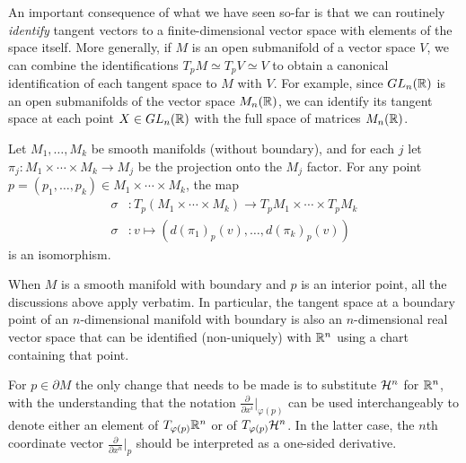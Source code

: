 An important consequence of what we have seen so-far is that we can routinely \emph{identify} tangent vectors to a finite-dimensional vector space with elements of the space itself.
More generally, if $M$ is an open submanifold of a vector space $V$, we can combine the identifications $T_p M \simeq T_p V \simeq V$ to obtain a canonical identification of each tangent space to $M$ with $V$.
For example, since $GL_n(\mathbb{R})$ is an open submanifolds of the vector space $M_n(\mathbb{R})$, we can identify its tangent space at each point $X\in GL_n(\mathbb{R})$ with the full space of matrices $M_n(\mathbb{R})$.

\begin{exercise}
  Let $M_1, \ldots, M_k$ be smooth manifolds (without boundary), and for each $j$ let $\pi_j:M_1\times\cdots\times M_k \to M_j$ be the projection onto the $M_j$ factor.
  For any point $p=(p_1,\ldots,p_k)\in M_1\times\cdots\times M_k$, the map
  \begin{align}
    \sigma &: T_p(M_1\times\cdots\times M_k) \to T_p M_1\times\cdots\times T_p M_k\\
    \sigma &: v \mapsto \left(d(\pi_1)_p(v), \ldots, d(\pi_k)_p(v)\right)
  \end{align}
  is an isomorphism.
\end{exercise}

\begin{remark}
  When $M$ is a smooth manifold with boundary and $p$ is an interior point, all the discussions above apply verbatim. In particular, the tangent space at a boundary point of an $n$-dimensional manifold with boundary is also an $n$-dimensional real vector space that can be identified (non-uniquely) with $\mathbb{R}^n$ using a chart containing that point.

  For $p\in\partial M$ the only change that needs to be made is to substitute $\mathcal{H}^n$ for $\mathbb{R}^n$, with the understanding that the notation $\frac{\partial}{\partial x^i}\big|_{\varphi(p)}$ can be used interchangeably to denote either an element of $T_{\varphi(p)}\mathbb{R}^n$ or of $T_{\varphi(p)}\mathcal{H}^n$. In the latter case, the $n$th coordinate vector $\frac{\partial}{\partial x^n}\big|_{p}$ should be interpreted as a one-sided derivative.
\end{remark}

